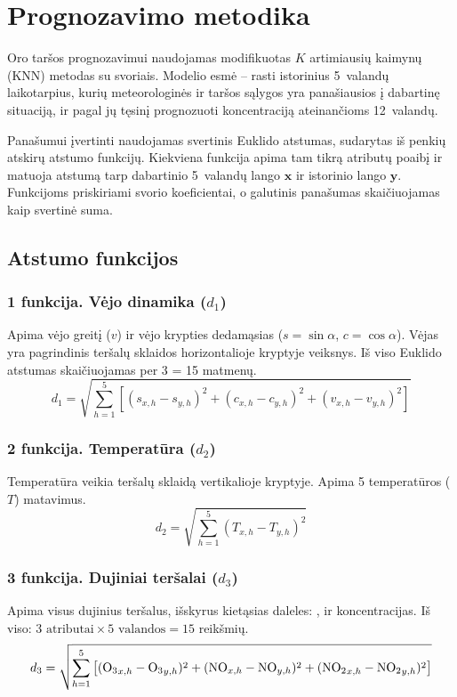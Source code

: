 \documentclass[]{VUMIFTemplateClass}
\begin{document}
    \section{Prognozavimo metodika}

    Oro taršos prognozavimui naudojamas modifikuotas $K$ artimiausių kaimynų (KNN) metodas su svoriais.
    Modelio esmė -- rasti istorinius 5~valandų laikotarpius, kurių meteorologinės ir taršos sąlygos yra panašiausios į dabartinę situaciją, ir pagal jų tęsinį prognozuoti  koncentraciją ateinančioms 12~valandų.

    Panašumui įvertinti naudojamas svertinis Euklido atstumas, sudarytas iš penkių atskirų atstumo funkcijų.
    Kiekviena funkcija apima tam tikrą atributų poaibį ir matuoja atstumą tarp dabartinio 5~valandų lango $\mathbf{x}$ ir istorinio lango $\mathbf{y}$.
    Funkcijoms priskiriami svorio koeficientai, o galutinis panašumas skaičiuojamas kaip svertinė suma.

    \subsection{Atstumo funkcijos}

    \subsubsection*{1 funkcija. Vėjo dinamika ($d_1$)}
    Apima vėjo greitį ($v$) ir vėjo krypties dedamąsias ($s = \sin\alpha$, $c = \cos\alpha$).
    Vėjas yra pagrindinis teršalų sklaidos horizontalioje kryptyje veiksnys.
    Iš viso Euklido atstumas skaičiuojamas per 3  = 15 matmenų.
    \begin{equation}
        d_1 = \sqrt{\sum_{h=1}^{5} \left[ (s_{x,h} - s_{y,h})^2 + (c_{x,h} - c_{y,h})^2 + (v_{x,h} - v_{y,h})^2 \right]}
    \end{equation}

    \subsubsection*{2 funkcija. Temperatūra ($d_2$)}
    Temperatūra veikia teršalų sklaidą vertikalioje kryptyje.
    Apima 5 temperatūros ($T$) matavimus.
    \begin{equation}
        d_2 = \sqrt{\sum_{h=1}^{5} (T_{x,h} - T_{y,h})^2}
    \end{equation}

    \subsubsection*{3 funkcija. Dujiniai teršalai ($d_3$)}
    Apima visus dujinius teršalus, išskyrus kietąsias daleles: ,  ir  koncentracijas.
    Iš viso: $3 \text{ atributai} \times 5 \text{ valandos} = 15$ reikšmių.
    \begin{equation}
        d_3 = \sqrt{\sum_{h=1}^{5} \left[ ({\ce{O3}}_{x,h} - {\ce{O3}}_{y,h})^2 + ({\ce{NO}}_{x,h} - {\ce{NO}}_{y,h})^2 + ({\ce{NO2}}_{x,h} - {\ce{NO2}}_{y,h})^2 \right]}
    \end{equation}
\end{document}
